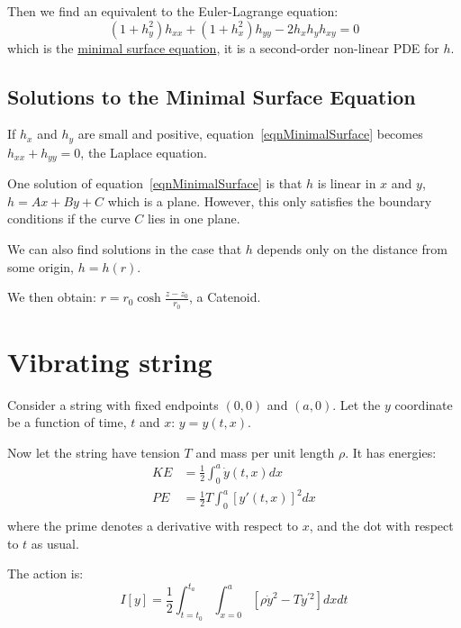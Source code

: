\documentclass[../Main.tex]{subfiles}
\begin{document}
Then we find an equivalent to the Euler-Lagrange equation:
\begin{equation}
    (1 + h_y^2)h_{xx} + (1 + h_x^2) h_{yy} - 2h_x h_y h_{xy} = 0
    \label{eqnMinimalSurface}
\end{equation}
which is the \underline{minimal surface equation}, it is a second-order non-linear PDE for $h$.
\subsection{Solutions to the Minimal Surface Equation}
If $h_x$ and $h_y$ are small and positive, equation~\ref{eqnMinimalSurface} becomes $h_{xx} + h_{yy} = 0$, the Laplace equation.

One solution of equation~\ref{eqnMinimalSurface} is that $h$ is linear in $x$ and $y$, $h = Ax + By + C$ which is a plane. However, this only satisfies the boundary conditions if the curve $C$ lies in one plane.

We can also find solutions in the case that $h$ depends only on the distance from some origin, $h = h(r)$.

We then obtain: $r = r_0 \cosh{\frac{z - z_0}{r_0}}$, a Catenoid.
\section{Vibrating string}
Consider a string with fixed endpoints $(0, 0)$ and $(a, 0)$. Let the $y$ coordinate be a function of time, $t$ and $x$: $y = y(t, x)$.

Now let the string have tension $T$ and mass per unit length $\rho$. It has energies:
\begin{align*}
    KE &= \frac{1}{2} \int_0^a \dot{y}(t, x) dx \\
    PE &= \frac{1}{2} T \int_0^a [y' (t, x)]^2 dx \\
\end{align*}
where the prime denotes a derivative with respect to $x$, and the dot with respect to $t$ as usual.

The action is:
\begin{equation*}
    I[y] = \frac{1}{2} \int_{t = t_0}^{t_a} \int_{x = 0}^a \left[\rho \dot{y}^2 - T y^{\prime 2}\right] dx dt
\end{equation*}
\end{document}
